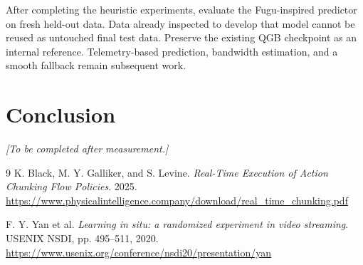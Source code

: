 \documentclass[11pt]{article}
\newcommand{\resultplaceholder}{\textit{[To be completed after measurement.]}}
\begin{document}
After completing the heuristic experiments, evaluate the Fugu-inspired predictor on fresh held-out data. Data already inspected to develop that model cannot be reused as untouched final test data. Preserve the existing QGB checkpoint as an internal reference. Telemetry-based prediction, bandwidth estimation, and a smooth fallback remain subsequent work.

\section{Conclusion}
\resultplaceholder

\begin{thebibliography}{9}
K. Black, M. Y. Galliker, and S. Levine.
\textit{Real-Time Execution of Action Chunking Flow Policies}.
2025.
\url{https://www.physicalintelligence.company/download/real_time_chunking.pdf}

F. Y. Yan et al.
\textit{Learning in situ: a randomized experiment in video streaming}.
USENIX NSDI, pp. 495--511, 2020.
\url{https://www.usenix.org/conference/nsdi20/presentation/yan}
\end{thebibliography}
\end{document}
